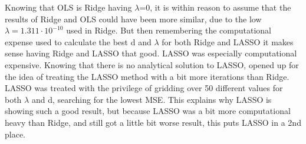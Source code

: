 \documentclass[../main.tex]{subfiles}
\begin{document}
Knowing that OLS is Ridge having $\lambda$=0, it is within reason to assume that the results of Ridge and OLS could have been more similar, due to the low $\lambda=1.311\cdot10^{-10}$ used in Ridge. But then remembering the computational expense used to calculate the best d and $\lambda$ for both Ridge and LASSO it makes sense having Ridge and LASSO that good. LASSO was especially computational expensive. Knowing that there is no analytical solution to LASSO, opened up for the idea of treating the LASSO method with a bit more iterations than Ridge. LASSO was treated with the privilege of gridding over 50 different values for both $\lambda$ and d, searching for the lowest MSE. This explains why LASSO is showing such a good result, but because LASSO was a bit more computational heavy than Ridge, and still got a little bit worse result, this puts LASSO in a 2nd place.
\end{document}
